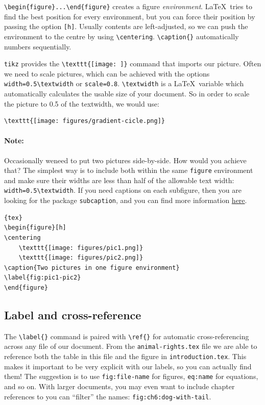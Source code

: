 \verb|\begin{figure}...\end{figure}| creates a figure \emph{environment}.
\LaTeX\ tries to find the best position for every environment, but you can force their position by passing the option \verb|[h]|.
Usually contents are left-adjusted, so we can push the environment to the centre by using \verb|\centering|.
\verb|\caption{}| automatically numbers sequentially.

\verb|tikz| provides the \verb|\texttt{[image: ]}| command that imports our picture.
Often we need to scale pictures, which can be achieved with the options \verb|width=0.5\textwidth| or \verb|scale=0.8|.
\verb|\textwidth| is a \LaTeX\ variable which automatically calculates the usable size of your document.
So in order to scale the picture to 0.5 of the textwidth, we would use:
\begin{lstlisting}
\texttt{[image: figures/gradient-cicle.png]}
\end{lstlisting}

\paragraph{Note:}
Occasionally weneed to put two pictures side-by-side. How would you achieve that? The simplest way is to include both within the same \verb|figure| environment and make sure their widths are less than half of the allowable text width: \verb|width=0.5\textwidth|.
If you need captions on each subfigure, then you are looking for the package \verb|subcaption|, and you can find more information \href{http://mirrors.ibiblio.org/CTAN/macros/latex/contrib/caption/subcaption.pdf}{here}.

\begin{lstlisting}{tex}
\begin{figure}[h]
\centering
    \texttt{[image: figures/pic1.png]}
    \texttt{[image: figures/pic2.png]}
\caption{Two pictures in one figure environment}
\label{fig:pic1-pic2}
\end{figure}
\end{lstlisting}   

\subsection{Label and cross-reference}
The \verb|\label{}| command is paired with \verb|\ref{}| for automatic cross-referencing across any file of our document.
From the \verb|animal-rights.tex| file we are able to reference both the table in this file and the figure in \verb|introduction.tex|.
This makes it important to be very explicit with our labels, so you can actually find them!
The suggestion is to use \verb|fig:file-name| for figures, \verb|eq:name| for equations, and so on.
With larger documents, you may even want to include chapter references to you can ``filter'' the names: \verb|fig:ch6:dog-with-tail|.

